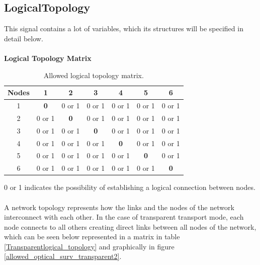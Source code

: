 \subsection{LogicalTopology}

This signal contains a lot of variables, which its structures will be specified in detail below.\\ \\
\clearpage
\textbf{Logical Topology Matrix}
\begin{table}[H]
	\centering	
	\begin{tabular}{|c|c|c|c|c|c|c|}
		\hline
		\multicolumn{1}{|l|}{\textbf{Nodes}} & 1   & 2   & 3   & 4   & 5   & 6   \\ \hline
		1                           & \textbf{0}   & 0 or 1 & 0 or 1 & 0 or 1 & 0 or 1 & 0 or 1 \\ \hline
		2                           & 0 or 1 & \textbf{0}   & 0 or 1 & 0 or 1 & 0 or 1 & 0 or 1 \\ \hline
		3                           & 0 or 1 & 0 or 1 & \textbf{0}   & 0 or 1 & 0 or 1 & 0 or 1 \\ \hline
		4                           & 0 or 1 & 0 or 1 & 0 or 1 & \textbf{0}   & 0 or 1 & 0 or 1 \\ \hline
		5                           & 0 or 1 & 0 or 1 & 0 or 1 & 0 or 1 & \textbf{0}   & 0 or 1 \\ \hline
		6                           & 0 or 1 & 0 or 1 & 0 or 1 & 0 or 1 & 0 or 1 & \textbf{0}   \\ \hline
	\end{tabular}
	\caption{Allowed logical topology matrix.}
	\label{logical_topology}
\end{table}
0 or 1 indicates the possibility of establishing a logical connection between nodes.\\ \\
A network topology represents how the links and the nodes of the network interconnect with each other. In the case of transparent transport mode, each node connects to all others creating direct links between all nodes of the network, which can be seen below represented in a matrix in table \ref{Transparentlogical_topology} and graphically in figure \ref{allowed_optical_surv_transparent2}.
